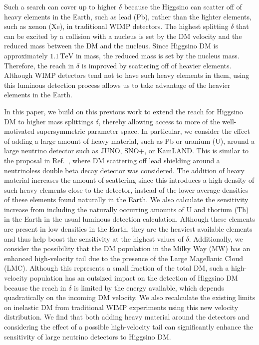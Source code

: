 \documentclass[aps,prd,amsmath,amssymb,10pt,letterpaper,balancelastpage,showpacs,superscriptaddress,nofootinbib,floatfix,notitlepage,longbibliography,twocolumn
]{revtex4-2}
\begin{document}
 Such a search \cite{Luminous} can cover up to higher $\delta$ because the Higgsino can scatter off of heavy elements in the Earth, such as lead (Pb), rather than the lighter elements, such as xenon (Xe), in traditional WIMP detectors.  The highest splitting $\delta$ that can be excited by a collision with a nucleus is set by the DM velocity and the reduced mass between the DM and the nucleus.  Since Higgsino DM is approximately $ 1.1 \, \text{TeV}$ in mass, the reduced mass is set by the nucleus mass.  Therefore, the reach in $\delta$ is improved by scattering off of heavier elements.  Although WIMP detectors tend not to have such heavy elements in them, using this luminous detection process allows us to take advantage of the heavier elements in the Earth.

In this paper, we build on this previous work \cite{Luminous} to extend the reach for Higgsino DM to higher mass splittings $\delta$, thereby allowing access to more of the well-motivated supersymmetric parameter space.  In particular, we consider the effect of adding a large amount of heavy material, such as Pb or uranium (U), around a large neutrino detector such as JUNO, SNO+, or KamLAND.  This is similar to the proposal in Ref.~\cite{Pospelov:2013nea}, where DM scattering off lead shielding around a neutrinoless double beta decay detector was considered.  The addition of heavy material increases the amount of scattering since this introduces a high density of such heavy elements close to the detector, instead of the lower average densities of these elements found naturally in the Earth.  We also calculate the sensitivity increase from including the naturally occurring amounts of U and thorium (Th) in the Earth in the usual luminous detection calculation.  Although these elements are present in low densities in the Earth, they are the heaviest available elements and thus help boost the sensitivity at the highest values of $\delta$. 
 Additionally, we consider the possibility that the DM population in the Milky Way (MW) has an enhanced high-velocity tail due to the presence of the Large Magellanic Cloud (LMC).  Although this represents a small fraction of the total DM, such a high-velocity population has an outsized impact on the detection of Higgsino DM because the reach in $\delta$ is limited by the energy available, which depends quadratically on the incoming DM velocity.  We also recalculate the existing limits on inelastic DM from traditional WIMP experiments using this new velocity distribution.
We find that both adding heavy material around the detectors and considering the effect of a possible high-velocity tail can significantly enhance the sensitivity of large neutrino detectors to Higgsino DM.
\end{document}
